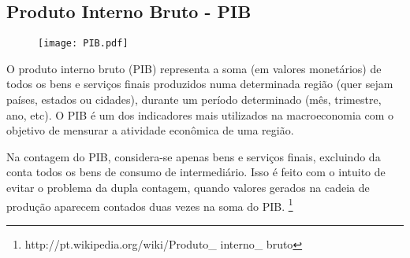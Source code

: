 \documentclass[../../relatorio.tex]{subfiles}
\begin{document}
\subsection{Produto Interno Bruto - PIB}

\begin{figure}[ht]
  \begin{minipage}{0.30\textheight}
    \centering
      \texttt{[image: PIB.pdf]}
  \end{minipage}
\end{figure}


O produto interno bruto (PIB) representa a soma (em valores monetários) de todos os bens e serviços finais produzidos numa determinada região (quer sejam países, estados ou cidades), durante um período determinado (mês, trimestre, ano, etc). O PIB é um dos indicadores mais utilizados na macroeconomia com o objetivo de mensurar a atividade econômica de uma região.

Na contagem do PIB, considera-se apenas bens e serviços finais, excluindo da conta todos os bens de consumo de intermediário. Isso é feito com o intuito de evitar o problema da dupla contagem, quando valores gerados na cadeia de produção aparecem contados duas vezes na soma do PIB. \footnote{http://pt.wikipedia.org/wiki/Produto\_ interno\_ bruto}


\pagebreak
\end{document}

